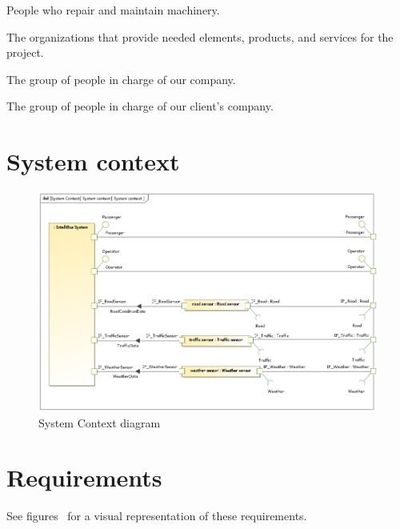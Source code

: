 \documentclass[a4paper]{article}
\begin{document}
\begin{description}[style=multiline,align=right,leftmargin=6cm]
	\item[mechanics]
		People who repair and maintain machinery.

	\item[suppliers]
		The organizations that provide needed elements, products, and
		services for the project.

	\item[our company’s management]
		The group of people in charge of our company.

	\item[client's management]
		The group of people in charge of our client's company.
\end{description}



\section{System context}

\begin{figure}[H]
	\centering
	\includegraphics[width=\textwidth]{context.jpg}
	\caption{System Context diagram}
\end{figure}


\section{Requirements}

See figures~ for a visual
representation of these requirements.
\end{document}
